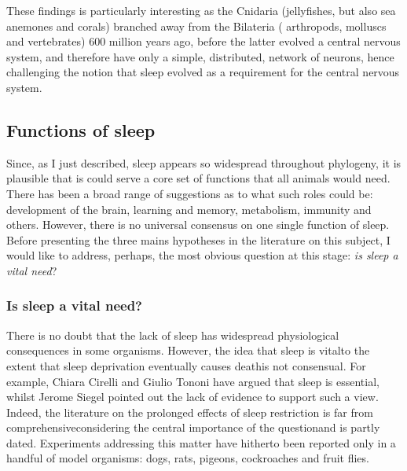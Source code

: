 These findings is particularly interesting as the Cnidaria (jellyfishes, but also sea anemones and corals) branched away from the Bilateria (\eg{} arthropods, molluscs and vertebrates) 600 million years ago, before the latter evolved a central nervous system, and therefore have only a simple, distributed, network of neurons\cite{dunn_animal_2014,katsuki_jellyfish_2013,arendt_nerve_2016}, hence challenging the notion that sleep evolved as a requirement for the central nervous system.

\subsection{Functions of sleep}
\label{sec:function}
Since, as I just described, sleep appears so widespread throughout phylogeny, it is plausible that is could serve a core set of functions that all animals would need.
There has been a broad range of suggestions as to what such roles could be:
development of the brain, learning and memory, metabolism, immunity and others.
However, there is no universal consensus on one single function of sleep\cite{cirelli_is_2008, siegel_sleep_2009}.
Before presenting the three mains hypotheses in the literature on this subject, I would like to address, 
perhaps, the most obvious question at this stage: \emph{is sleep a vital need}?

\subsubsection{Is sleep a vital need?}

There is no doubt that the lack of sleep has widespread physiological consequences in some organisms.
However, the idea that sleep is vital\emd{}to the extent that sleep deprivation eventually causes death\emd{}is not consensual.
For example, Chiara Cirelli and Giulio Tononi have argued that sleep is essential\cite{cirelli_is_2008},
whilst Jerome Siegel pointed out the lack of evidence to support such a view\cite{siegel_sleep_2009}.
Indeed, the literature on the prolonged effects of sleep restriction is far from comprehensive\emd{}considering the central importance of the question\emd{}and is partly dated.
Experiments addressing this matter have hitherto been reported only in a handful of model organisms:
dogs\cite{bentivoglio_pioneering_1997}, 
rats\cite{rechtschaffen_physiological_1983, rechtschaffen_sleep_1995}, 
pigeons\cite{newman_sleep_2008},
cockroaches\cite{stephenson_prolonged_2007}
and fruit flies\cite{shaw_stress_2002}.

